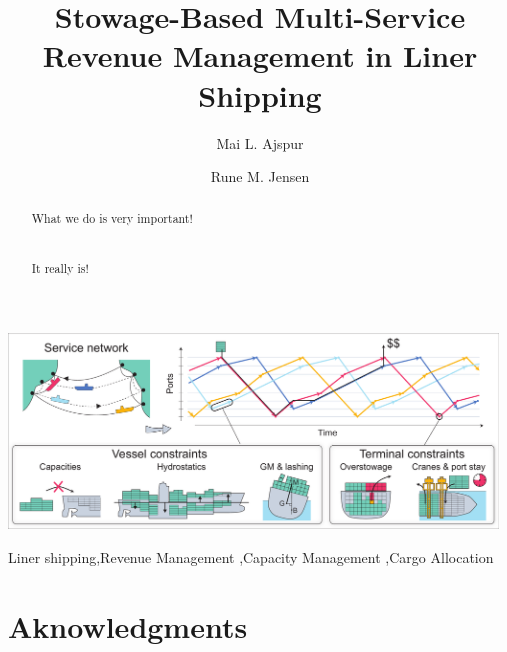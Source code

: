 \documentclass[a4paper,fleqn]{cas-sc}
\begin{document}
\let\WriteBookmarks\relax
\def\floatpagepagefraction{1}
\def\textpagefraction{.001}

\title[mode = title]{Stowage-Based Multi-Service Revenue Management in Liner Shipping}                      

\author[1]{Mai L. Ajspur}
\address[1]{Rued Langgaards Vej 7, 2300 Copenhagen S, Denmark}

\author[1]{Rune M. Jensen}
\cormark[1]


\begin{abstract}
What we do is very important!\\\\\\It really is!
\end{abstract}


\begin{graphicalabstract}
\includegraphics[width=13cm]{figures/abstract.pdf}
\end{graphicalabstract}

\begin{keywords}
Liner shipping\sep Revenue Management \sep Capacity Management \sep Cargo Allocation%
\end{keywords}

\maketitle








\section*{Aknowledgments}



%

%

\end{document}
